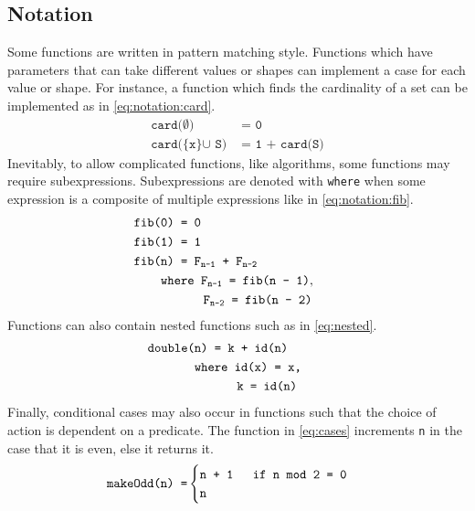 \subsection{Notation}
Some functions are written in pattern matching style.
Functions which have parameters that can take different values or shapes can implement a case for each value or shape.
For instance, a function which finds the cardinality of a set can be implemented as in \autoref{eq:notation:card}.
\begin{align}
  \texttt{card($\emptyset$) }&\texttt{= 0} \label{eq:notation:card} \\
  \texttt{card(\{x\} $\cup$ S) }&\texttt{= 1 + card(S)} \tag*{}
\end{align}
Inevitably, to allow complicated functions, like algorithms, some functions may require subexpressions.
Subexpressions are denoted with \texttt{where} when some expression is a composite of multiple expressions like in \autoref{eq:notation:fib}.
\begin{align}
  \texttt{fib(0) }&\texttt{= 0} \label{eq:notation:fib} \\
  \texttt{fib(1) }&\texttt{= 1} \tag*{} \\
  \texttt{fib(n) }&\texttt{= F$_\texttt{n-1}$ + F$_\texttt{n-2}$} \tag*{} \\
  \texttt{whe}&\texttt{re F$_\texttt{n-1}$ = fib(n - 1)},\tag*{}\\
  &\hspace{0.62cm}\texttt{F$_\texttt{n-2}$ = fib(n - 2)}\tag*{}
\end{align}
Functions can also contain nested functions such as in \autoref{eq:nested}.
\begin{align}
  \texttt{double(n) }&\texttt{= k + id(n)} \label{eq:nested} \\
  \texttt{whe}&\texttt{re id(x) = x,} \tag*{}\\
  &\hspace{0.62cm}\texttt{k = id(n)} \tag*{}
\end{align}
Finally, conditional cases may also occur in functions such that the choice of action is dependent on a predicate.
The function in \autoref{eq:cases} increments \texttt{n} in the case that it is even, else it returns it.
\begin{align}
  \texttt{makeOdd(n) }&\texttt{=} 
  \begin{cases}
    \texttt{n + 1} & \texttt{ if n \texttt{mod} 2 = 0 }\\
    \texttt{n} & 
  \end{cases}\label{eq:cases} 
\end{align}
